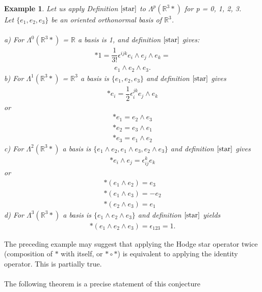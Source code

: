 \documentclass[12pt,a4paper]{article}
\newtheorem{exmp}{Example}[section]
\begin{document}
\begin{exmp}
Let us apply Definition $\ref{star}$ to $\Lambda^p(\mathbb{R}^3*)$ for p = 0, 1, 2, 3.\\
Let $\{e_1, e_2, e_3 \}$ be an oriented orthonormal basis of $\mathbb{R}^3$.
\\\\
a) For $\Lambda^0(\mathbb{R}^3*)$ = $\mathbb{R}$ a basis is 1, and definition $\ref{star}$ gives:
\begin{align*}
\ast 1 = \dfrac{1}{3!} \epsilon^{ijk} e_i \wedge e_j \wedge e_k =
\end{align*}
\begin{align*}
 e_1 \wedge e_2 \wedge e_3.
\end{align*}
b) For $\Lambda^1(\mathbb{R}^3*)$ = $\mathbb{R}^3$ a basis is $\{e_1, e_2, e_3 \}$ and definition $\ref{star}$ gives 
\begin{align*}
\ast e_i = \dfrac{1}{2} \epsilon^{jk}_i e_j \wedge e_k
\end{align*}
or
\begin{align*}
\ast e_1 = e_2 \wedge e_3\\
\ast e_2 = e_3 \wedge e_1\\
\ast e_3 = e_1 \wedge e_2
\end{align*}
c) For $\Lambda^2(\mathbb{R}^3*)$ a basis is $\{ e_1 \wedge e_2, e_1 \wedge e_3, e_2 \wedge e_3 \}$ and definition $\ref{star}$ gives
\begin{align*}
\ast e_i \wedge e_j = \epsilon^k_{ij} e_k
\end{align*}
or
\begin{align*}
\ast (e_1 \wedge e_2) = e_3\\
\ast (e_1 \wedge e_3) = - e_2\\
\ast(e_2 \wedge e_3) = e_1
\end{align*}
d) For $\Lambda^3(\mathbb{R}^3*)$ a basis is $\{ e_1 \wedge e_2 \wedge e_3 \}$ and definition $\ref{star}$ yields
\begin{align*}
\ast ( e_1 \wedge e_2 \wedge e_3) = \epsilon_{123}= 1.
\end{align*}
\end{exmp}
The preceding example may suggest that applying the Hodge star operator twice (composition of $\ast$ with itself, or $\ast \circ \ast$) is equivalent to applying the
identity operator. This is partially true. \\\\The following theorem is a precise
statement of this conjecture
\end{document}
